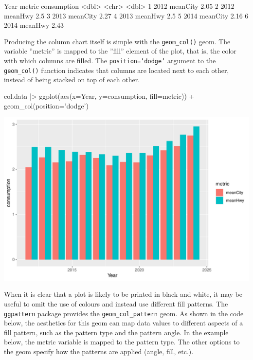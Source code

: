 \begin{samepage}
\begin{textcode}
   Year metric   consumption
  <dbl> <chr>          <dbl>
1  2012 meanCity        2.05
2  2012 meanHwy         2.5 
3  2013 meanCity        2.27
4  2013 meanHwy         2.5 
5  2014 meanCity        2.16
6  2014 meanHwy         2.43
\end{textcode}
\end{samepage}

Producing the column chart itself is simple with the \texttt{geom\_col()} geom. The variable ''metric'' is mapped to the ''fill'' element of the plot, that is, the color with which columns are filled. The \texttt{position='dodge'} argument to the \texttt{geom\_col()} function indicates that columns are located next to each other, instead of being stacked on top of each other. 

\begin{Rcode}
col.data |> 
   ggplot(aes(x=Year, y=consumption, fill=metric)) +
      geom_col(position='dodge')
\end{Rcode}

\begin{center}
  \includegraphics[width=.8\textwidth]{fuel.columns.pdf}
\end{center}

When it is clear that a plot is likely to be printed in black and white, it may be useful to omit the use of colours and instead use different fill patterns. The \texttt{ggpattern} package provides the \texttt{geom\_col\_pattern} geom. As shown in the code below, the aesthetics for this geom can map data values to different aspects of a fill pattern, such as the pattern type and the pattern angle. In the example below, the metric variable is mapped to the pattern type. The other options to the geom specify how the patterns are applied (angle, fill, etc.).

